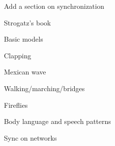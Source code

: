 \begin{frame}
  Add a section on synchronization

  Strogatz's book

  Basic models
  
  Clapping

  Mexican wave

  Walking/marching/bridges

  Fireflies

  Body language and speech patterns

  Sync on networks
  
\end{frame}